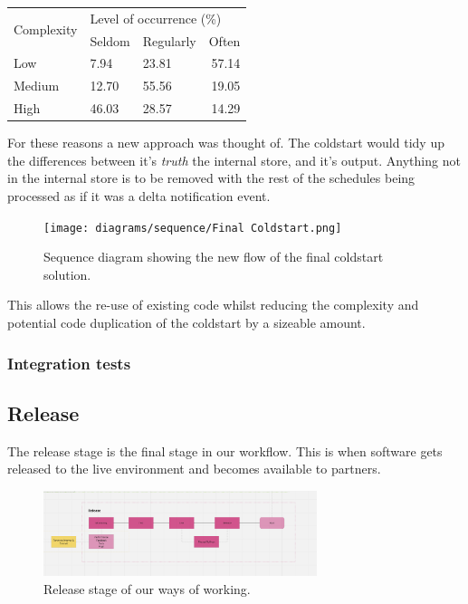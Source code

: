 \begin{table}[H]
  \centering
  \begin{tabular}{|l|llr|}
  \hline
  \multicolumn{1}{|c|}{\multirow{2}{*}{Complexity}} & \multicolumn{3}{l|}{Level of occurrence (\%)}                        \\ \cline{2-4} 
  \multicolumn{1}{|c|}{}                            & \multicolumn{1}{l|}{Seldom} & \multicolumn{1}{l|}{Regularly} & Often \\ \hline
  Low                                               & \multicolumn{1}{l|}{7.94}   & \multicolumn{1}{l|}{23.81}     & 57.14 \\ \hline
  Medium                                            & \multicolumn{1}{l|}{12.70}  & \multicolumn{1}{l|}{55.56}     & 19.05 \\ \hline
  High                                              & \multicolumn{1}{l|}{46.03}  & \multicolumn{1}{l|}{28.57}     & 14.29 \\ \hline
  \end{tabular}
  \end{table}

  For these reasons a new approach was thought of. The coldstart would tidy up the differences between it's \textit{truth} the internal store, and 
  it's output. Anything not in the internal store is to be removed with the rest of the schedules being processed as if it was a delta notification 
  event.

  \begin{figure}[H]
    \centering
    \texttt{[image: diagrams/sequence/Final Coldstart.png]}
    \caption{Sequence diagram showing the new flow of the final coldstart solution.}
    \label{fig:finalColdstart}
  \end{figure}

  This allows the re-use of existing code whilst reducing the complexity and potential code duplication of the coldstart by a sizeable amount.

  \newpage
  \subsubsection{Integration tests}

  \newpage
  \subsection{Release}
  The release stage is the final stage in our workflow. This is when software gets released to the live environment and becomes available to partners. 
  \begin{figure}[H]
    \centering
    \includegraphics[width=8cm]{assets/workflow/release.png}
    \caption{Release stage of our ways of working.}
    \label{fig:workflowRelease}
  \end{figure}
  
